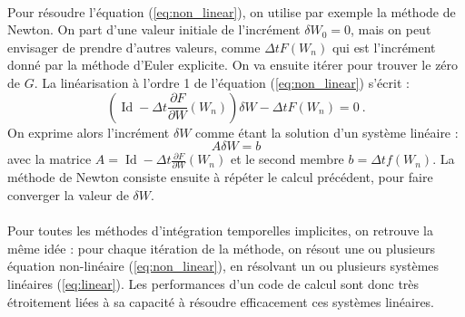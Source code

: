 	\paragraph{}
	Pour résoudre l'équation (\ref{eq:non_linear}), on utilise par exemple la méthode de Newton.
	On part d'une valeur initiale de l'incrément $\delta W_0 = 0$, mais on peut envisager de prendre d'autres valeurs, comme $\Delta t F\left(W_n\right)$ qui est l'incrément donné par la méthode d'Euler explicite.
	On va ensuite itérer pour trouver le zéro de $G$.
	La linéarisation à l'ordre 1 de l'équation (\ref{eq:non_linear}) s'écrit :
	\[\left(\operatorname{Id} - \Delta t\frac{\partial F}{\partial W}\left(W_n\right)\right)\delta W -\Delta t F\left(W_n\right) = 0\ .\]
	On exprime alors l'incrément $\delta W$ comme étant la solution d'un système linéaire :
	\begin{equation}\label{eq:linear}
		A\delta W = b
	\end{equation}
	avec la matrice $A = \operatorname{Id} - \Delta t\frac{\partial F}{\partial W}\left(W_n\right)$ et le second membre $b = \Delta t f\left(W_n\right)$.
	La méthode de Newton consiste ensuite à répéter le calcul précédent, pour faire converger la valeur de $\delta W$.

	\paragraph{}
	Pour toutes les méthodes d'intégration temporelles implicites, on retrouve la même idée : pour chaque itération de la méthode, on résout une ou plusieurs équation non-linéaire (\ref{eq:non_linear}), en résolvant un ou plusieurs systèmes linéaires (\ref{eq:linear}).
	Les performances d'un code de calcul sont donc très étroitement liées à sa capacité à résoudre efficacement ces systèmes linéaires.

